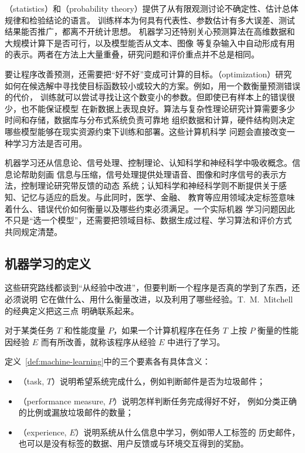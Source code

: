 （statistics）和（probability theory）提供了从有限观测讨论不确定性、估计总体规律和检验结论的语言。
训练样本为何具有代表性、参数估计有多大误差、测试结果能否推广，都离不开统计思想。
机器学习还特别关心预测算法在高维数据和大规模计算下是否可行，以及模型能否从文本、图像
等复杂输入中自动形成有用的表示。两者在方法上大量重叠，研究问题和评价重点并不总是相同。

要让程序改善预测，还需要把“好不好”变成可计算的目标。（optimization）研究
如何在候选解中寻找使目标函数较小或较大的方案。例如，用一个数衡量预测错误的代价，
训练就可以尝试寻找让这个数变小的参数。但即使已有样本上的错误很少，也不能保证模型
在新数据上表现良好。算法与复杂性理论研究计算需要多少时间和存储，数据库与分布式系统负责可靠地
组织数据和计算，硬件结构则决定哪些模型能够在现实资源约束下训练和部署。这些计算机科学
问题会直接改变一种学习方法是否可用。

机器学习还从信息论、信号处理、控制理论、认知科学和神经科学中吸收概念。信息论帮助刻画
信息与压缩，信号处理提供处理语音、图像和时序信号的表示方法，控制理论研究带反馈的动态
系统；认知科学和神经科学则不断提供关于感知、记忆与适应的启发。与此同时，医学、金融、
教育等应用领域决定标签意味着什么、错误代价如何衡量以及哪些约束必须满足。一个实际机器
学习问题因此不只是“选一个模型”，还需要把领域目标、数据生成过程、学习算法和评价方式
共同规定清楚。

\subsection{机器学习的定义}

这些研究路线都谈到“从经验中改进”，但要判断一个程序是否真的学到了东西，还必须说明
它在做什么、用什么衡量改进，以及利用了哪些经验。T.~M.~Mitchell的经典定义把这三点
明确联系起来。

\begin{definition}[机器学习]
\label{def:machine-learning}
对于某类任务 $T$ 和性能度量 $P$，如果一个计算机程序在任务 $T$ 上按 $P$ 衡量的性能
因经验 $E$ 而有所改善，就称该程序从经验 $E$ 中进行了学习。
\end{definition}

定义~\ref{def:machine-learning}中的三个要素各有具体含义：

\begin{itemize}
  \item {}（task, $T$）说明希望系统完成什么，例如判断邮件是否为垃圾邮件；
  \item {}（performance measure, $P$）说明怎样判断任务完成得好不好，
    例如分类正确的比例或漏放垃圾邮件的数量；
  \item {}（experience, $E$）说明系统从什么信息中学习，例如带人工标签的
    历史邮件，也可以是没有标签的数据、用户反馈或与环境交互得到的奖励。
\end{itemize}

